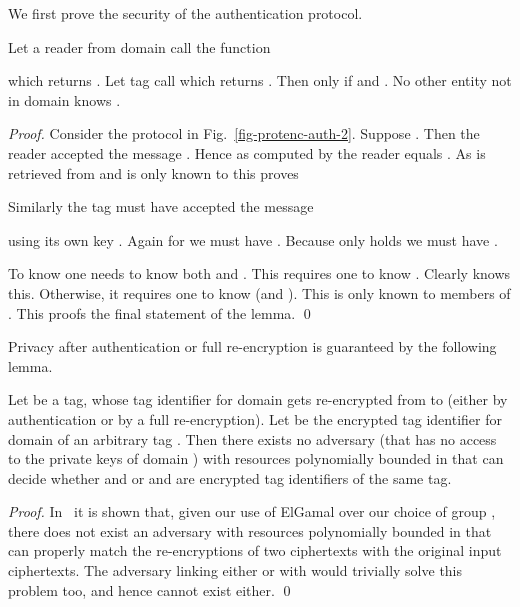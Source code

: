 We first prove the security of the authentication protocol.
\begin{lemma}
\label{lem-auth}
Let a reader from domain  call the function
 
which returns . Let tag  call
 which returns . Then 
 only
if  and . No other entity not in
domain  knows .
\end{lemma}
\begin{proof}
Consider the protocol in Fig.~\ref{fig-protenc-auth-2}.
Suppose . 
Then the reader accepted the message
. Hence  as
computed by the reader equals . As
 is retrieved from  and  is only known to
 this proves 

Similarly the tag must have accepted the message

using its own key . Again
for 
we must have . Because only  holds 
 we must have .


To know  one needs to know both  and . This requires one
to know . Clearly  knows this. Otherwise, it requires one to
know  (and ). This is only known to members of . This
proofs the final statement of the lemma.
\qed
\end{proof}




Privacy after authentication or full re-encryption is guaranteed by the
following lemma.
\begin{lemma}
\label{lem-privacy}
Let  be a tag, whose tag identifier  for domain 
gets re-encrypted from  to  (either by authentication or by a
full re-encryption). Let  be the encrypted tag identifier for domain
 of an arbitrary tag . Then there exists no
adversary (that has no access to the private keys of domain ) with
resources polynomially bounded in  that can decide whether 
and  or  and  are encrypted tag identifiers of the
same tag.
\end{lemma}

\begin{proof}
In~\cite{golle2004reencryption} it is shown that, given our use of
ElGamal over our choice of group , there does not exist an adversary with
resources polynomially bounded in  that can properly match the
re-encryptions of two ciphertexts with the original input ciphertexts. 
The adversary linking either  or  with  would
trivially solve this problem too, and hence cannot exist either.
\qed
\end{proof}



